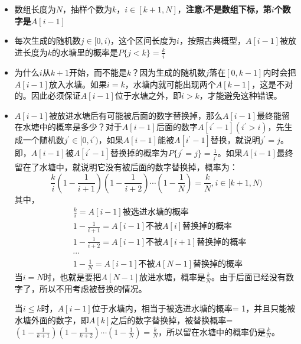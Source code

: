 \documentclass{article}
\begin{document}
\begin{itemize}
	\item 数组长度为$N$，抽样个数为$k$，$i \in [k+1,N]$，\textbf{注意$i$不是数组下标，第$i$个数字是$A[i-1]$}
	\item 每次生成的随机数$j \in [0,i)$，这个区间长度为$i$，按照古典概型，$A[i-1]$被放进长度为$k$的水塘里的概率是$P\{j<k\}=\frac{k}{i}$
	\item 为什么$i$从$k+1$开始，而不能是$k$？因为生成的随机数$j$落在$[0,k-1]$内时会把$A[i-1]$放入水塘。如果$i=k$，水塘内就可能出现两个$A[k-1]$，这是不对的。因此必须保证$A[i-1]$位于水塘之外，即$i>k$，才能避免这种错误。
	\item $A[i-1]$被放进水塘后有可能被后面的数字替换掉，那么$A[i-1]$最终能留在水塘中的概率是多少？对于$A[i-1]$后面的数字$A[i^\prime-1] (i^\prime > i)$，先生成一个随机数$j^\prime \in [0,i^\prime)$，如果$A[i-1]$能被$A[i^\prime-1]$替换，就说明$j^\prime = j$。即，$A[i-1]$被$A[i^\prime-1]$替换掉的概率为$P\{j^\prime=j\}=\frac{1}{i^\prime}$。如果$A[i-1]$最终留在了水塘中，就说明它没有被后面的数字替换掉，概率为：
	\begin{equation*}
		\frac{k}{i}(1-\frac{1}{i+1})(1-\frac{1}{i+2})\cdots(1-\frac{1}{N})=\frac{k}{N}, i \in [k+1,N)
	\end{equation*}
	其中，
	\begin{align*}
		& \frac{k}{i} = A[i-1]\text{被选进水塘的概率} \\
		& 1-\frac{1}{i+1} = A[i-1]\text{不被}A[i]\text{替换掉的概率} \\
		& 1-\frac{1}{i+2} = A[i-1]\text{不被}A[i+1]\text{替换掉的概率} \\
		& \cdots \\
		& 1-\frac{1}{N} = A[i-1]\text{不被}A[N-1]\text{替换掉的概率}
	\end{align*}
	当$i=N$时，也就是要把$A[N-1]$放进水塘，概率是$\frac{k}{N}$。由于后面已经没有数字了，所以不用考虑被替换的情况。
	
	当$i\leqslant k$时，$A[i-1]$位于水塘内，相当于被选进水塘的概率= 1，并且只能被水塘外面的数字，即$A[k]$之后的数字替换掉，被替换概率= $(1-\frac{1}{k+1})(1-\frac{1}{k+2})\cdots(1-\frac{1}{N})=\frac{k}{N}$，所以留在水塘中的概率仍是$\frac{k}{N}$。
\end{itemize}
\end{document}
